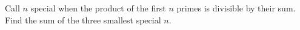 Call $n$ special when the product of the first $n$ primes is divisible by their sum. Find the sum of the three smallest special $n$.
